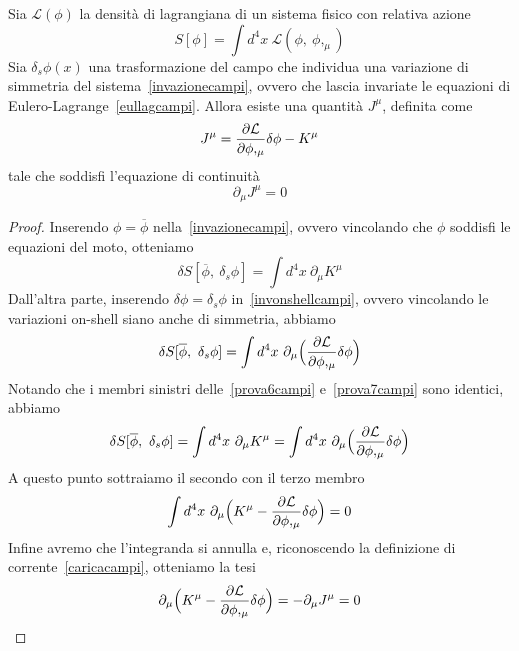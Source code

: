     \begin{theorem}
        Sia $\mathcal L(\phi)$ la densità di lagrangiana di un sistema fisico con relativa azione
    \begin{equation*}
        S[\phi] = \int d^4 x ~ \mathcal L(\phi,~\phi,_\mu)
    \end{equation*}
        Sia $\delta_s \phi(x)$ una trasformazione del campo che individua una variazione di simmetria del sistema~\eqref{invazionecampi}, ovvero che lascia invariate le equazioni di Eulero-Lagrange~\eqref{eullagcampi}. Allora esiste una quantità $J^\mu$, definita come
    \begin{equation}\label{caricacampi}
        J^\mu = \frac{\partial\mathcal L}{\partial\phi,_\mu} \delta \phi - K^\mu
    \end{equation}
        tale che soddisfi l'equazione di continuità
    \begin{equation} \label{thcampi}
        \partial_\mu J^\mu = 0
    \end{equation}
    \end{theorem}

    \begin{proof}
        Inserendo $\phi = \overline \phi$ nella~\eqref{invazionecampi}, ovvero vincolando che $\phi$ soddisfi le equazioni del moto, otteniamo 
    \begin{equation}\label{prova6campi}
        \delta S[\overline \phi, ~\delta_s \phi] = \int d^4 x ~ \partial_\mu K^\mu
    \end{equation}
        Dall'altra parte, inserendo $\delta \phi = \delta_s \phi$ in~\eqref{invonshellcampi}, ovvero vincolando le variazioni on-shell siano anche di simmetria, abbiamo
    \begin{equation}\label{prova7campi}
        \delta S[\overline \phi,~\delta_s \phi] = \int d^4 x ~ \partial_\mu \Big ( \frac{\partial\mathcal L}{\partial\phi,_\mu}  \delta \phi \Big)
    \end{equation}
        Notando che i membri sinistri delle~\eqref{prova6campi} e~\eqref{prova7campi} sono identici, abbiamo
    \begin{equation*}
        \delta S[\overline \phi, ~\delta_s \phi] = \int d^4 x~ \partial_\mu K^\mu = \int d^4 x ~ \partial_\mu \Big ( \frac{\partial\mathcal L}{\partial\phi,_\mu}  \delta \phi \Big)
    \end{equation*}
        A questo punto sottraiamo il secondo con il terzo membro
    \begin{equation*}
        \int d^4 x ~ \partial_\mu \Big ( K^\mu - \frac{\partial\mathcal L}{\partial\phi,_\mu} \delta \phi \Big) = 0
    \end{equation*}
        Infine avremo che l'integranda si annulla e, riconoscendo la definizione di corrente~\eqref{caricacampi}, otteniamo la tesi
    \begin{equation*}
        \partial_\mu \Big ( K^\mu - \frac{\partial\mathcal L}{\partial\phi,_\mu}  \delta \phi \Big) = - \partial_\mu J^\mu = 0
    \end{equation*}
    \end{proof}

